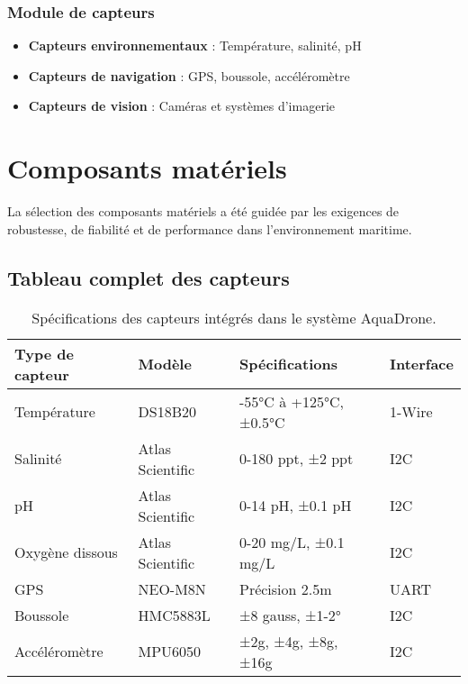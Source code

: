 {\subsubsection{Module de capteurs}
\begin{itemize}
    \item \textbf{Capteurs environnementaux} : Température, salinité, pH
    \item \textbf{Capteurs de navigation} : GPS, boussole, accéléromètre
    \item \textbf{Capteurs de vision} : Caméras et systèmes d'imagerie
\end{itemize}

\section{Composants matériels}
La sélection des composants matériels a été guidée par les exigences de robustesse, de fiabilité et de performance dans l'environnement maritime.

\subsection{Tableau complet des capteurs}
\begin{table}[!htpb]
    \caption{Spécifications des capteurs intégrés dans le système AquaDrone.}
    \label{tab:capteurs}
    \centering
    \begin{tabular}{llll}
        \toprule
        \textbf{Type de capteur} & \textbf{Modèle} & \textbf{Spécifications} & \textbf{Interface} \\ 
        \midrule
        Température & DS18B20 & -55°C à +125°C, ±0.5°C & 1-Wire \\
        Salinité & Atlas Scientific & 0-180 ppt, ±2 ppt & I2C \\
        pH & Atlas Scientific & 0-14 pH, ±0.1 pH & I2C \\
        Oxygène dissous & Atlas Scientific & 0-20 mg/L, ±0.1 mg/L & I2C \\
        GPS & NEO-M8N & Précision 2.5m & UART \\
        Boussole & HMC5883L & ±8 gauss, ±1-2° & I2C \\
        Accéléromètre & MPU6050 & ±2g, ±4g, ±8g, ±16g & I2C \\
        \bottomrule
    \end{tabular}
\end{table}

}

